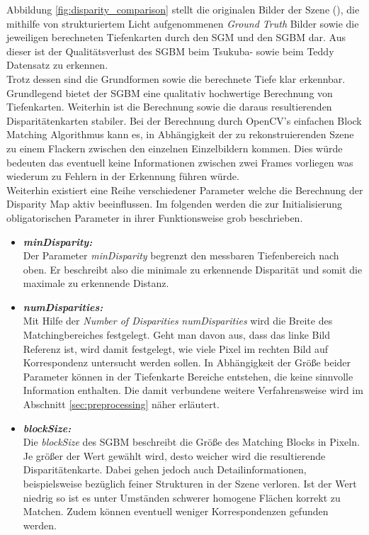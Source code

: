 \noindent
Abbildung \ref{fig:disparity_comparison} stellt die originalen Bilder der Szene (\cite{middlebury_data}), die mithilfe von strukturiertem Licht aufgenommenen \emph{Ground Truth} Bilder sowie die jeweiligen berechneten Tiefenkarten durch den SGM und den SGBM dar. Aus dieser ist der Qualitätsverlust des SGBM beim Tsukuba- sowie beim Teddy Datensatz zu erkennen.\\

\noindent
Trotz dessen sind die Grundformen sowie die berechnete Tiefe klar erkennbar. Grundlegend bietet der SGBM eine qualitativ hochwertige Berechnung von Tiefenkarten. Weiterhin ist die Berechnung sowie die daraus resultierenden Disparitätenkarten stabiler. Bei der Berechnung durch OpenCV's einfachen Block Matching Algorithmus kann es, in Abhängigkeit der zu rekonstruierenden Szene zu einem Flackern zwischen den einzelnen Einzelbildern kommen. Dies würde bedeuten das eventuell keine Informationen zwischen zwei Frames vorliegen was wiederum zu Fehlern in der Erkennung führen würde.\\

\noindent
Weiterhin existiert eine Reihe verschiedener Parameter welche die Berechnung der Disparity Map aktiv beeinflussen. Im folgenden werden die zur Initialisierung obligatorischen Parameter in ihrer Funktionsweise grob beschrieben.

\begin{itemize}
	\item \textbf{\emph{minDisparity:}}\\
	Der Parameter \emph{minDisparity} begrenzt den messbaren Tiefenbereich nach oben. Er beschreibt also die minimale zu erkennende Disparität und somit die maximale zu erkennende Distanz.
 	\item \textbf{\emph{numDisparities:}}\\
 	Mit Hilfe der \emph{Number of Disparities} \emph{numDisparities} wird die Breite des Matchingbereiches festgelegt. Geht man davon aus, dass das linke Bild Referenz ist, wird damit festgelegt, wie viele Pixel im rechten Bild auf Korrespondenz untersucht werden sollen. In Abhängigkeit der Größe beider Parameter können in der Tiefenkarte Bereiche entstehen, die keine sinnvolle Information enthalten. Die damit verbundene weitere Verfahrensweise wird im Abschnitt \ref{sec:preprocessing} näher erläutert.
	\item \textbf{\emph{blockSize:}}\\
	Die \emph{blockSize} des SGBM beschreibt die Größe des Matching Blocks in Pixeln. Je größer der Wert gewählt wird, desto weicher wird die resultierende Disparitätenkarte. Dabei gehen jedoch auch Detailinformationen, beispielsweise bezüglich feiner Strukturen in der Szene verloren. Ist der Wert niedrig so ist es unter Umständen schwerer homogene Flächen korrekt zu Matchen. Zudem können eventuell weniger Korrespondenzen gefunden werden.
\end{itemize}


